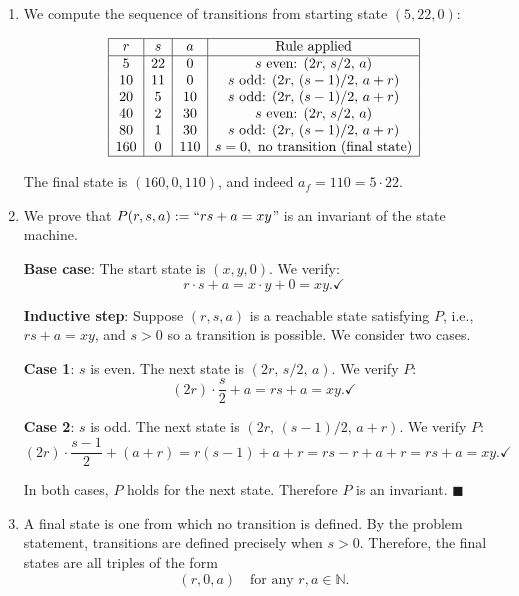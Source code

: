 \documentclass[11pt]{article}
\begin{document}
\begin{enumerate}[label=\textbf{(\alph*)}]

\item We compute the sequence of transitions from starting state $(5, 22, 0)$:

\[
\begin{array}{|c|c|c|c|}
\hline
r & s & a & \text{Rule applied} \\
\hline
5  & 22 & 0   & s \text{ even: } (2r,\, s/2,\, a) \\
10 & 11 & 0   & s \text{ odd: } (2r,\, (s-1)/2,\, a+r) \\
20 & 5  & 10  & s \text{ odd: } (2r,\, (s-1)/2,\, a+r) \\
40 & 2  & 30  & s \text{ even: } (2r,\, s/2,\, a) \\
80 & 1  & 30  & s \text{ odd: } (2r,\, (s-1)/2,\, a+r) \\
160& 0  & 110 & s = 0, \text{ no transition (final state)} \\
\hline
\end{array}
\]

The final state is $(160, 0, 110)$, and indeed $a_f = 110 = 5 \cdot 22$. \checkmark

\item We prove that $P(r, s, a) := ``rs + a = xy$'' is an invariant of the state machine.

\textbf{Base case}: The start state is $(x, y, 0)$. We verify:
\[
    r \cdot s + a = x \cdot y + 0 = xy. \checkmark
\]

\textbf{Inductive step}: Suppose $(r, s, a)$ is a reachable state satisfying $P$,
i.e., $rs + a = xy$, and $s > 0$ so a transition is possible. We consider two cases.

\textbf{Case 1}: $s$ is even. The next state is $(2r,\, s/2,\, a)$. We verify $P$:
\[
    (2r)\cdot\frac{s}{2} + a = rs + a = xy. \checkmark
\]

\textbf{Case 2}: $s$ is odd. The next state is $(2r,\, (s-1)/2,\, a+r)$.
We verify $P$:
\[
    (2r)\cdot\frac{s-1}{2} + (a + r) = r(s-1) + a + r = rs - r + a + r = rs + a = xy.
    \checkmark
\]

In both cases, $P$ holds for the next state. Therefore $P$ is an invariant. $\blacksquare$

\item A final state is one from which no transition is defined. By the problem
statement, transitions are defined precisely when $s > 0$. Therefore, the final states
are all triples of the form
\[
    (r, 0, a) \quad \text{for any } r, a \in \mathbb{N}.
\]


\end{enumerate}
\end{document}
